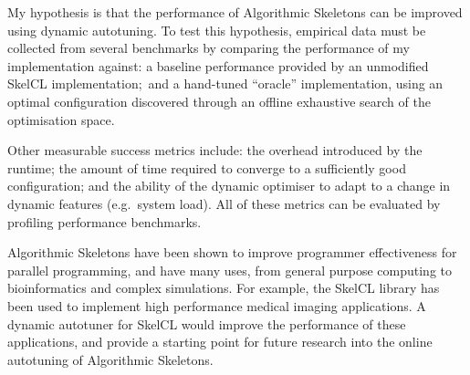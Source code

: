 My hypothesis is that the performance of Algorithmic Skeletons can be
improved using dynamic autotuning. To test this hypothesis, empirical
data must be collected from several benchmarks by comparing the
performance of my implementation against: a baseline performance
provided by an unmodified SkelCL implementation;\ and a hand-tuned
``oracle'' implementation, using an optimal configuration discovered
through an offline exhaustive search of the optimisation space.

Other measurable success metrics include: the overhead introduced by
the runtime; the amount of time required to converge to a sufficiently
good configuration; and the ability of the dynamic optimiser to adapt
to a change in dynamic features (e.g.\ system load). All of these
metrics can be evaluated by profiling performance benchmarks.

Algorithmic Skeletons have been shown to improve programmer
effectiveness for parallel programming, and have many uses, from
general purpose computing to bioinformatics and complex
simulations. For example, the SkelCL library has been used to
implement high performance medical imaging applications. A dynamic
autotuner for SkelCL would improve the performance of these
applications, and provide a starting point for future research into
the online autotuning of Algorithmic Skeletons.



